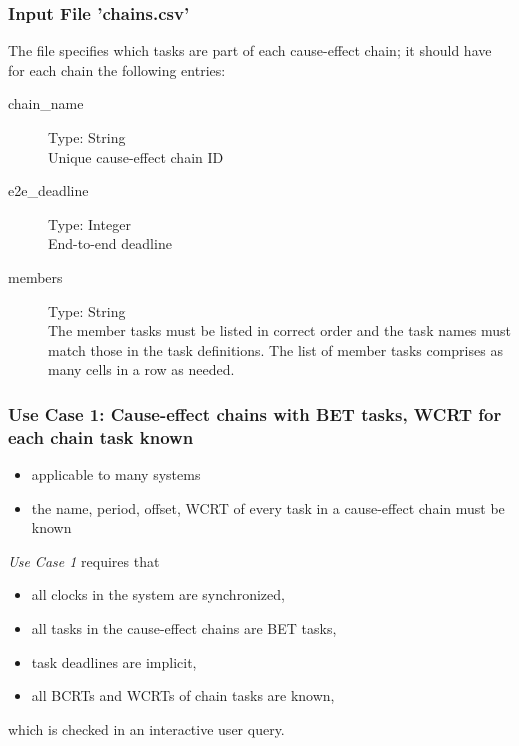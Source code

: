 \subsubsection{Input File 'chains.csv'}
\label{sec:input-files-chains}
The  file specifies which tasks are part of each cause-effect chain; it should have for each chain the following entries:
\begin{description}
		\item [chain\_name] Type: String \hfill \\ 
		Unique cause-effect chain ID
		\item [e2e\_deadline] Type: Integer \hfill \\ 
		End-to-end deadline 		
		\item [members] Type: String \hfill \\ 
		The member tasks must be listed in correct order and the task names must match those in the task definitions. The list of member tasks comprises as many cells in a row as needed.
\end{description}



\newpage
\subsubsection{Use Case 1: Cause-effect chains with BET tasks, WCRT for each chain task known}
\label{sec:input-files-bet1}

\begin{tcolorbox}
\begin{itemize}[leftmargin=*, itemsep=0pt]
	\item applicable to many systems
	\item the name, period, offset, WCRT of every task in a cause-effect chain must be known
\end{itemize}
\end{tcolorbox}
\bigskip

\emph{Use Case 1} requires that
\begin{itemize}[leftmargin=*, itemsep=0pt]
	\item all clocks in the system are synchronized,
	\item all tasks in the cause-effect chains are BET tasks,
	\item task deadlines are implicit,
	\item all BCRTs and WCRTs of chain tasks are known,
\end{itemize}
which is checked in an interactive user query.
\bigskip

